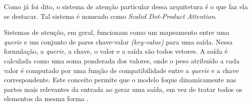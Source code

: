 \begin{figure}[h!]
		\centering
\end{figure}

Como já foi dito, o sistema de atenção particular dessa arquitetura é o que faz ela se destacar. Tal sistema é nomeado como \textit{Scaled Dot-Product Attention}. 

Sistemas de atenção, em geral, funcionam como um mapeamento entre uma \textit{querie} e um conjunto de pares chave-valor \textit{(key-value)} para uma saída. Nessa formulação, a \textit{querie}, a chave, o valor e a saída são todos vetores. A saída é calculada como uma soma ponderada dos valores, onde o peso atribuído a cada valor é computado por uma função de compatibilidade entre a \textit{querie} e a chave correspondente. Este conceito permite que o modelo foque dinamicamente nas partes mais relevantes da entrada ao gerar uma saída, em vez de tratar todos os elementos da mesma forma \cite{vaswani_attention_2017}.

